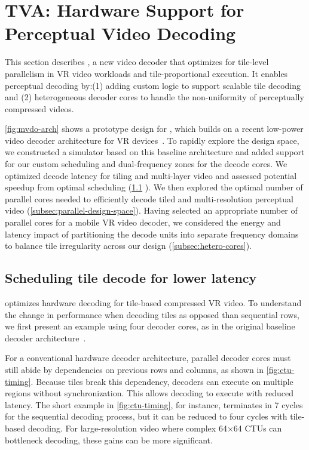 \vfill\null

\section{TVA: Hardware Support for Perceptual Video Decoding}
\label{sec:vdo-hw}

This section describes \nameArch, a new video decoder that optimizes for tile-level parallelism in VR video workloads and tile-proportional execution.
It enables perceptual decoding by:(1) adding custom logic to support scalable tile decoding and (2) heterogeneous decoder cores to handle the non-uniformity of perceptually compressed videos.

\vdoOverview

\ref{fig:mvdo-arch} shows a prototype design for \nameArch, which builds on a recent low-power video decoder architecture for VR devices~\cite{tikekar18ijssc}.
To rapidly explore the design space, we constructed a simulator based on this baseline architecture and added support for our custom scheduling and dual-frequency zones for the decode cores.
We optimized decode latency for tiling and multi-layer video and assessed potential speedup from optimal scheduling (\ref{subsec:tile-sched} ).
We then explored the optimal number of parallel cores needed to efficiently decode tiled and multi-resolution perceptual video (\ref{subsec:parallel-design-space}).
Having selected an appropriate number of parallel cores for a mobile VR video decoder, we considered the energy and latency impact of partitioning the decode units into separate frequency domains to balance tile irregularity across our design (\ref{subsec:hetero-cores}).

\subsection{Scheduling tile decode for lower latency}
\label{subsec:tile-sched}
\nameArch optimizes hardware decoding for tile-based compressed VR video.
To understand the change in performance when decoding tiles as opposed than sequential rows, we first present an example using four decoder cores, as in the original baseline decoder architecture~\cite{hevcThesis}.


\vdecCTUTimingFigure

For a conventional hardware decoder architecture, parallel decoder cores must still abide by dependencies on previous rows and columns, as shown in \ref{fig:ctu-timing}.
Because tiles break this dependency, decoders can execute on multiple regions without synchronization.
This allows decoding to execute with reduced latency.
The short example in \ref{fig:ctu-timing}, for instance, terminates in 7 cycles for the sequential decoding process, but it can be reduced to four cycles with tile-based decoding.
For large-resolution video where complex 64$\times$64 CTUs can bottleneck decoding, these gains can be more significant.

